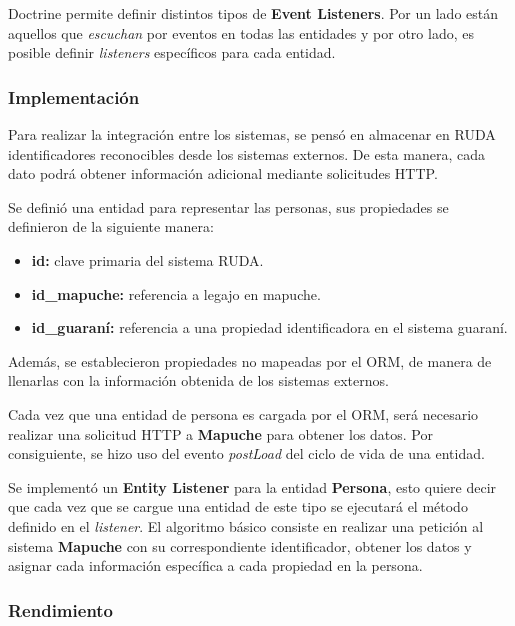 Doctrine permite definir distintos tipos de \textbf{Event Listeners}. Por un lado están aquellos que \textit{escuchan} por eventos en todas las entidades y por otro lado, es posible definir
\textit{listeners} específicos para cada entidad.

\subsubsection{Implementación}%
\label{ssub:implementación}


Para realizar la integración entre los sistemas, se pensó en almacenar en RUDA identificadores reconocibles desde los sistemas externos\@. De esta manera,
cada dato podrá obtener información adicional mediante solicitudes HTTP\@.

Se definió una entidad para representar las personas, sus propiedades se definieron de la siguiente manera:

\begin{itemize}
    \item \textbf{id:} clave primaria del sistema RUDA\@.
    \item \textbf{id\_mapuche:} referencia a legajo en mapuche\@.
    \item \textbf{id\_guaraní:} referencia a una propiedad identificadora en el sistema guaraní\@.
\end{itemize}

Además, se establecieron propiedades no mapeadas por el ORM, de manera de llenarlas con la información obtenida de los sistemas externos.

Cada vez que una entidad de persona es cargada por el ORM, será necesario realizar una solicitud HTTP a \textbf{Mapuche} para obtener los datos\@. Por consiguiente, se hizo uso del evento \textit{postLoad}
del ciclo de vida de una entidad.


Se implementó un \textbf{Entity Listener} para la entidad \textbf{Persona}, esto quiere decir que cada vez que se cargue una entidad de este tipo se ejecutará el método definido en el \textit{listener}\@.
El algoritmo básico consiste en realizar una petición al sistema \textbf{Mapuche} con su correspondiente identificador, obtener los datos y asignar cada información específica a cada propiedad en la
persona.


\subsubsection{Rendimiento}%
\label{ssub:rendimiento}

